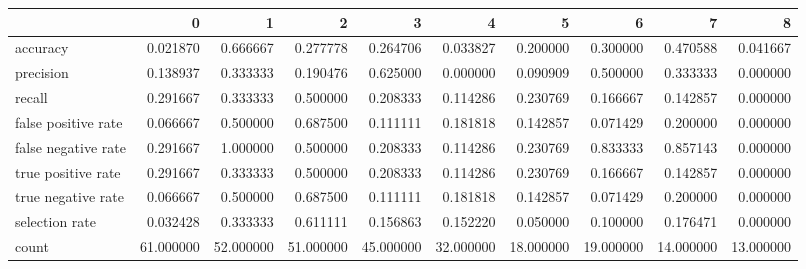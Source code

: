 \begin{tabular}{lrrrrrrrrr}
\toprule
{} &          0 &          1 &          2 &          3 &          4 &          5 &          6 &          7 &          8 \\
\midrule
accuracy            &   0.021870 &   0.666667 &   0.277778 &   0.264706 &   0.033827 &   0.200000 &   0.300000 &   0.470588 &   0.041667 \\
precision           &   0.138937 &   0.333333 &   0.190476 &   0.625000 &   0.000000 &   0.090909 &   0.500000 &   0.333333 &   0.000000 \\
recall              &   0.291667 &   0.333333 &   0.500000 &   0.208333 &   0.114286 &   0.230769 &   0.166667 &   0.142857 &   0.000000 \\
false positive rate &   0.066667 &   0.500000 &   0.687500 &   0.111111 &   0.181818 &   0.142857 &   0.071429 &   0.200000 &   0.000000 \\
false negative rate &   0.291667 &   1.000000 &   0.500000 &   0.208333 &   0.114286 &   0.230769 &   0.833333 &   0.857143 &   0.000000 \\
true positive rate  &   0.291667 &   0.333333 &   0.500000 &   0.208333 &   0.114286 &   0.230769 &   0.166667 &   0.142857 &   0.000000 \\
true negative rate  &   0.066667 &   0.500000 &   0.687500 &   0.111111 &   0.181818 &   0.142857 &   0.071429 &   0.200000 &   0.000000 \\
selection rate      &   0.032428 &   0.333333 &   0.611111 &   0.156863 &   0.152220 &   0.050000 &   0.100000 &   0.176471 &   0.000000 \\
count               &  61.000000 &  52.000000 &  51.000000 &  45.000000 &  32.000000 &  18.000000 &  19.000000 &  14.000000 &  13.000000 \\
\bottomrule
\end{tabular}
